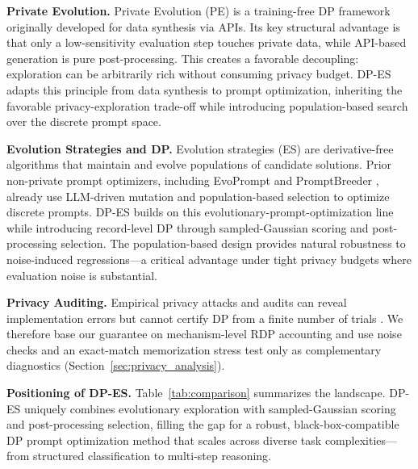 \noindent\textbf{Private Evolution.}
Private Evolution (PE) \cite{lin2024dpsda_images,xie2024dpsda_text,lin2025simpe} is a training-free DP framework originally developed for data synthesis via APIs. Its key structural advantage is that only a low-sensitivity evaluation step touches private data, while API-based generation is pure post-processing. This creates a favorable decoupling: exploration can be arbitrarily rich without consuming privacy budget. DP-ES adapts this principle from data synthesis to prompt optimization, inheriting the favorable privacy-exploration trade-off while introducing population-based search over the discrete prompt space.

\noindent\textbf{Evolution Strategies and DP.}
Evolution strategies (ES) \cite{rechenberg1973evolutionsstrategie} are derivative-free algorithms that maintain and evolve populations of candidate solutions. Prior non-private prompt optimizers, including EvoPrompt \cite{guo2024evoprompt} and PromptBreeder \cite{fernando2023promptbreeder}, already use LLM-driven mutation and population-based selection to optimize discrete prompts. DP-ES builds on this evolutionary-prompt-optimization line while introducing record-level DP through sampled-Gaussian scoring and post-processing selection. The population-based design provides natural robustness to noise-induced regressions---a critical advantage under tight privacy budgets where evaluation noise is substantial.

\noindent\textbf{Privacy Auditing.}
Empirical privacy attacks and audits can reveal implementation errors but cannot certify DP from a finite number of trials \cite{nasr2021adversary,jagielski2020auditing}. We therefore base our guarantee on mechanism-level RDP accounting and use noise checks and an exact-match memorization stress test only as complementary diagnostics (Section~\ref{sec:privacy_analysis}).

\noindent\textbf{Positioning of DP-ES.}
Table~\ref{tab:comparison} summarizes the landscape. DP-ES uniquely combines evolutionary exploration with sampled-Gaussian scoring and post-processing selection, filling the gap for a robust, black-box-compatible DP prompt optimization method that scales across diverse task complexities---from structured classification to multi-step reasoning.

